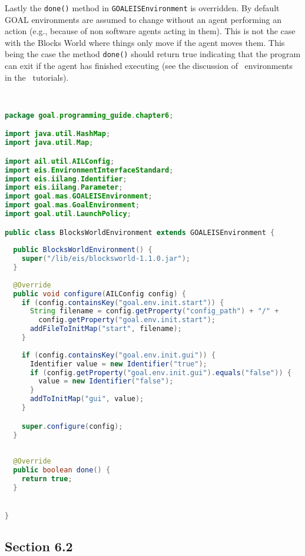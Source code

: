 Lastly the \texttt{done()} method in \texttt{GOALEISEnvironment} is overridden.  By default GOAL environments are assumed to change without an agent performing an action (e.g., because of non software agents acting in them).  This is not the case with the Blocks World where things only move if the agent moves them.  This being the case the method \texttt{done()} should return true indicating that the program can exit if the agent has finished executing (see the discussion of \ail\ environments in the \ail\ tutorials).

\begin{ourexample}
\label{code:blocksworld} \quad \\
\begin{lstlisting}[basicstyle=\sffamily,language=Java,style=easslisting]
package goal.programming_guide.chapter6;

import java.util.HashMap;
import java.util.Map;

import ail.util.AILConfig;
import eis.EnvironmentInterfaceStandard;
import eis.iilang.Identifier;
import eis.iilang.Parameter;
import goal.mas.GOALEISEnvironment;
import goal.mas.GoalEnvironment;
import goal.util.LaunchPolicy;

public class BlocksWorldEnvironment extends GOALEISEnvironment {
	
  public BlocksWorldEnvironment() {
    super("/lib/eis/blocksworld-1.1.0.jar");		
  }
	
  @Override
  public void configure(AILConfig config) {
    if (config.containsKey("goal.env.init.start")) {
      String filename = config.getProperty("config_path") + "/" +
        config.getProperty("goal.env.init.start");
      addFileToInitMap("start", filename);
    }
		
    if (config.containsKey("goal.env.init.gui")) {
      Identifier value = new Identifier("true");
      if (config.getProperty("goal.env.init.gui").equals("false")) {
        value = new Identifier("false");
      }
      addToInitMap("gui", value);
    }

    super.configure(config);
  }
	
	
  @Override
  public boolean done() {
    return true;
  }


}
\end{lstlisting}
\end{ourexample}

\subsection{Section 6.2}
\label{sec:6.2}

